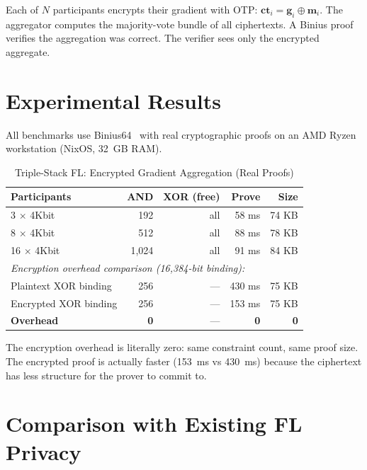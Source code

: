 \documentclass[11pt]{article}
\begin{document}
Each of $N$ participants encrypts their gradient with OTP: $\mathbf{ct}_i = \mathbf{g}_i \oplus \mathbf{m}_i$. The aggregator computes the majority-vote bundle of all ciphertexts. A Binius proof verifies the aggregation was correct. The verifier sees only the encrypted aggregate.

\section{Experimental Results}

All benchmarks use Binius64~\cite{binius64} with real cryptographic proofs on an AMD Ryzen workstation (NixOS, 32~GB RAM).

\begin{table}[h]
\centering
\caption{Triple-Stack FL: Encrypted Gradient Aggregation (Real Proofs)}
\begin{tabular}{@{}lrrrr@{}}
\toprule
\textbf{Participants} & \textbf{AND} & \textbf{XOR (free)} & \textbf{Prove} & \textbf{Size} \\
\midrule
3 $\times$ 4Kbit & 192 & all & 58 ms & 74 KB \\
8 $\times$ 4Kbit & 512 & all & 88 ms & 78 KB \\
16 $\times$ 4Kbit & 1,024 & all & 91 ms & 84 KB \\
\midrule
\multicolumn{5}{l}{\emph{Encryption overhead comparison (16,384-bit binding):}} \\
Plaintext XOR binding & 256 & --- & 430 ms & 75 KB \\
Encrypted XOR binding & 256 & --- & 153 ms & 75 KB \\
\textbf{Overhead} & \textbf{0} & --- & \textbf{0} & \textbf{0} \\
\bottomrule
\end{tabular}
\end{table}

The encryption overhead is literally zero: same constraint count, same proof size. The encrypted proof is actually faster (153~ms vs 430~ms) because the ciphertext has less structure for the prover to commit to.

\section{Comparison with Existing FL Privacy}
\end{document}
